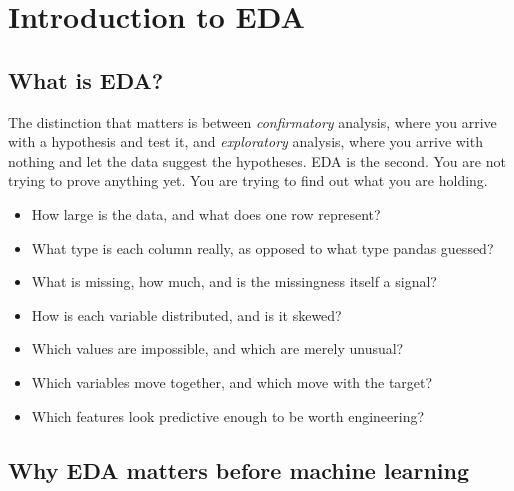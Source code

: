 \documentclass[11pt,a4paper]{article}
\begin{document}
\notebookcover

\section{Introduction to EDA}

\subsection{What is EDA?}


The distinction that matters is between \emph{confirmatory} analysis, where you arrive with
a hypothesis and test it, and \emph{exploratory} analysis, where you arrive with nothing
and let the data suggest the hypotheses. EDA is the second. You are not trying to prove
anything yet. You are trying to find out what you are holding.


\begin{itemize}\itemsep2pt
  \item How large is the data, and what does one row represent?
  \item What type is each column really, as opposed to what type pandas guessed?
  \item What is missing, how much, and is the missingness itself a signal?
  \item How is each variable distributed, and is it skewed?
  \item Which values are impossible, and which are merely unusual?
  \item Which variables move together, and which move with the target?
  \item Which features look predictive enough to be worth engineering?
\end{itemize}


\subsection{Why EDA matters before machine learning}
\end{document}
